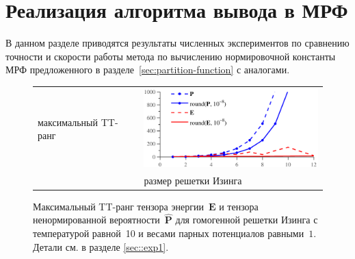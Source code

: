 \section{Реализация алгоритма вывода в МРФ} \label{sec:mrf-code}

В данном разделе приводятся результаты численных экспериментов по сравнению точности и скорости работы метода по вычислению нормировочной константы МРФ предложенного в разделе~\ref{sec:partition-function} с аналогами.

\begin{figure}[t]
\begin{center}
\begin{tabular}{m{0.3cm}@{}m{7cm}}
\begin{sideways}
\parbox{3.5cm}{\centering\scriptsize максимальный TT\hyp{}ранг }
\end{sideways}
& \includegraphics[width=7.0cm]{images/ranks_growth_temp=10,N=12,J=1_v2.pdf}
\\
& \parbox{7.3cm}{\centering\scriptsize размер решетки Изинга } \\
\end{tabular}
\caption{Максимальный TT\hyp{}ранг тензора энергии~$\mathbf{E}$ и тензора ненормированной вероятности~$\widehat{\mathbf{P}}$ для гомогенной решетки Изинга с температурой равной~10 и весами парных потенциалов равными~$1$. Детали см. в разделе \ref{sec::exp1}. \label{fig:ranks-growth}}
\end{center}
\end{figure}

